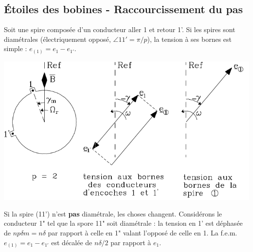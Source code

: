 	\subsection{Étoiles des bobines - Raccourcissement du pas}
	Soit une spire composée d'un conducteur aller 1 et retour 1'. Si les spires sont 
	diamétrales (électriquement opposé, $\angle 11' = \pi/p$), la tension à ses bornes 
	est simple : $e_{(1)} = e_1-e_{1'}$.
	\begin{center}
	\includegraphics[scale=0.38]{ch5/image6.png}
	\end{center}
	
	\newpage	
	Si la spire (11') n'est \textbf{pas} diamétrale, les choses changent. Considérons 
	le conducteur 1" tel que la spore 11" soit diamétrale : la tension en 1' est 
	déphasée de $np\delta m=n\delta$ par rapport à celle en 1" valant l'opposé de celle 
	en 1. La f.e.m. $e_{(1)}=e_1-e_{1'}$ est décalée de $n\delta/2$ par rapport à $e_1$.\\
	
